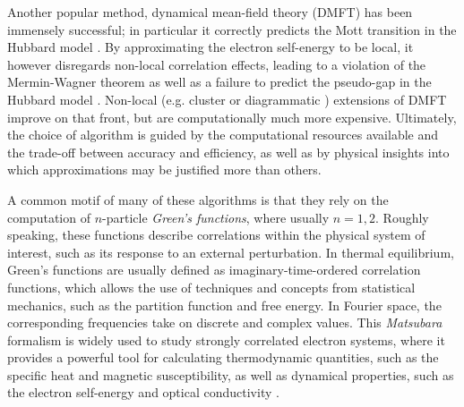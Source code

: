 \documentclass{SciPost}
\begin{document}
Another popular method, dynamical mean-field theory (DMFT) has been immensely successful; in particular it correctly predicts the Mott transition in the Hubbard model \cite{RevModPhys.68.13}. By approximating the electron self-energy to be local, it however disregards non-local correlation effects, leading to a violation of the Mermin-Wagner theorem \cite{PhysRevLett.17.1307, PhysRev.158.383} as well as a failure to predict the pseudo-gap in the Hubbard model \cite{Schafer2020TrackingTF}. Non-local (e.g. cluster \cite{RevModPhys.77.1027, RevModPhys.78.865, 10.1063/1.2199446, PhysRevB.62.R9283} or diagrammatic \cite{RevModPhys.90.025003}) extensions of DMFT improve on that front, but are computationally much more expensive. Ultimately, the choice of algorithm is guided by the computational resources available and the trade-off between accuracy and efficiency, as well as by physical insights into which approximations may be justified more than others.

A common motif of many of these algorithms is that they rely on the computation of $n$-particle \textsl{Green's functions}, where usually $n = 1, 2$. Roughly speaking, these functions describe correlations within the physical system of interest, such as its response to an external perturbation. In thermal equilibrium, Green's functions are usually defined as imaginary-time-ordered correlation functions, which allows the use of techniques and concepts from statistical mechanics, such as the partition function and free energy. In Fourier space, the corresponding frequencies take on discrete and complex values. This \textsl{Matsubara} formalism is widely used to study strongly correlated electron systems, where it provides a powerful tool for calculating thermodynamic quantities, such as the specific heat and magnetic susceptibility, as well as dynamical properties, such as the electron self-energy and optical conductivity \cite{10.1143/PTP.14.351, doi:10.1143/JPSJ.12.570}.
\end{document}
